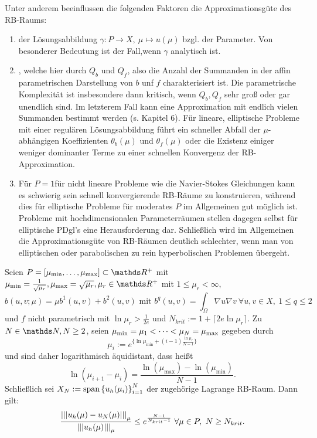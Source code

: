 Unter anderem beeinflussen die folgenden Faktoren die Approximationsgüte des RB-Raums:
\begin{enumerate}[(1)]
	\item {} der Lösungsabbildung $\gamma: P\to X,~\mu\mapsto u(\mu)$ bzgl. der Parameter.
	Von besonderer Bedeutung ist der Fall,wenn $\gamma$ analytisch ist.
	\item {}, welche hier durch $Q_b$ und $Q_f$, also die Anzahl der Summanden in der affin parametrischen Darstellung von $b$ unf $f$ charakterisiert ist.
	Die parametrische Komplexität ist insbesondere dann kritisch, wenn $Q_b,Q_f$ sehr groß oder gar unendlich sind.
	Im letzterem Fall kann eine Approximation mit endlich vielen Summanden bestimmt werden (s. Kapitel 6). 
	Für lineare, elliptische Probleme mit einer regulären Lösungsabbildung führt ein schneller Abfall der $\mu$-abhängigen Koeffizienten $\theta_b(\mu)$ und $\theta_f(\mu)$ oder die Existenz einiger weniger dominanter Terme zu einer schnellen Konvergenz der RB-Approximation.
	\item {} Für $P=1$für nicht lineare Probleme wie die Navier-Stokes Gleichungen kann es schwierig sein schnell konvergierende RB-Räume zu konstruieren, während dies für elliptische Probleme für moderates $P$ im Allgemeinen gut möglich ist.
	Probleme mit hochdimensionalen Parameterräumen stellen dagegen selbst für elliptische PDgl's eine Herausforderung dar.
	Schließlich wird im Allgemeinen die Approximationsgüte von RB-Räumen deutlich schlechter, wenn man von elliptischen oder parabolischen zu rein hyperbolischen Problemen übergeht. 
\end{enumerate}

Seien $P=[\mu_{\min}\dt{,}\mu_{\max}] \subset \R^+$ mit $\mu_{\min} = \frac{1}{\sqrt{\mu_r}},\mu_{\max}= \sqrt{\mu_r},\mu_r\in\R^+$ mit $1\le \mu_r < \infty$,
\[
b(u,v;\mu) = \mu b^1(u,v) + b^2(u,v) \text{ mit } b^q(u,v) = \int_{\Omega} \nabla u\nabla v ~\forall u,v\in X,~ 1\le q\le 2
\]
und $f$ nicht parametrisch mit $\ln \mu_r > \frac{1}{2e}$ und $N_{krit} := 1+ \lceil 2e \ln \mu_r \rceil$.
Zu $N\in\N, N\ge 2$, seien $\mu_{\min} = \mu_1 < \dots < \mu_N=\mu_{\max}$ gegeben durch
\[
\mu_i := e^{\{\ln \mu_{\min} + (i-1)\frac{\ln \mu_r}{N-1}\}}
\]
und sind daher logarithmisch äquidistant, dass heißt
\[
\ln(\mu_{i+1}-\mu_i) = \frac{\ln(\mu_{\max})-\ln(\mu_{\min})}{N-1}.
\]
Schließlich sei $X_N := \operatorname{span}\left\{ u_h(\mu_i)\right\}_{i=1}^N$ der zugehörige Lagrange RB-Raum.
Dann gilt:
\[
\frac{\left|\left|\left|u_h(\mu)-u_N(\mu)\right|\right|\right|_\mu}{\left|\left|\left|u_h(\mu)\right|\right|\right|_\mu} \le e^{\frac{N-1}{N_{krit}-1}} ~\forall \mu\in P,~N\ge N_{krit}.
\]

